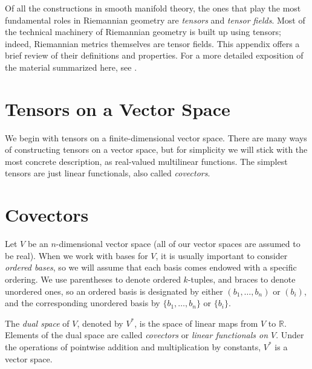 
Of all the constructions in smooth manifold theory, the ones that play the most fundamental roles in Riemannian geometry are \emph{tensors} and \emph{tensor fields}. Most of the technical machinery of Riemannian geometry is built up using tensors; indeed, Riemannian metrics themselves are tensor fields. This appendix offers a brief review of their definitions and properties. For a more detailed exposition of the material summarized here, see \cite{LeeSM}.

\section{Tensors on a Vector Space}

We begin with tensors on a finite-dimensional vector space. There are many ways of constructing tensors on a vector space, but for simplicity we will stick with the most concrete description, as real-valued multilinear functions. The simplest tensors are just linear functionals, also called \emph{covectors}.

\section{Covectors}

Let $V$ be an $n$-dimensional vector space (all of our vector spaces are assumed to be real). When we work with bases for $V$, it is usually important to consider \emph{ordered bases}, so we will assume that each basis comes endowed with a specific ordering. We use parentheses to denote ordered $k$-tuples, and braces to denote unordered ones, so an ordered basis is designated by either $(b_1,\ldots,b_n)$ or $(b_i)$, and the corresponding unordered basis by $\{b_1,\ldots,b_n\}$ or $\{b_i\}$.

The \emph{dual space} of $V$, denoted by $V^*$, is the space of linear maps from $V$ to $\mathbb{R}$. Elements of the dual space are called \emph{covectors} or \emph{linear functionals on $V$}. Under the operations of pointwise addition and multiplication by constants, $V^*$ is a vector space.

